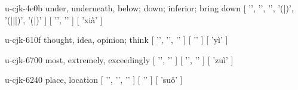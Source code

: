 \begin{multicols}{2}
\cjkgGlue{} u-cjk-4e0b  under, underneath, below; down; inferior; bring down  [ '\cjkgGlue{}', '\cjkgGlue{}', '\cjkgGlue{}', '\cjkgGlue{}(\cjkgGlue{}|\cjkgGlue{})', '\cjkgGlue{}(\cjkgGlue{}|\cjkgGlue{}|\cjkgGlue{}|\cjkgGlue{})', '\cjkgGlue{}(\cjkgGlue{}|\cjkgGlue{})' ]  [ '\cjkgGlue{}', '\cjkgGlue{}' ]  [ 'xià' ] 

\cjkgGlue{} u-cjk-610f  thought, idea, opinion; think  [ '\cjkgGlue{}', '\cjkgGlue{}', '\cjkgGlue{}' ]  [ '\cjkgGlue{}' ]  [ 'yì' ] 

\cjkgGlue{} u-cjk-6700  most, extremely, exceedingly  [ '\cjkgGlue{}', '\cjkgGlue{}' ]  [ '\cjkgGlue{}', '\cjkgGlue{}' ]  [ 'zuì' ] 

\cjkgGlue{} u-cjk-6240  place, location  [ '\cjkgGlue{}', '\cjkgGlue{}', '\cjkgGlue{}' ]  [ '\cjkgGlue{}' ]  [ 'su{\mktsRsgFb{}ǒ}' ] 


\end{multicols}
